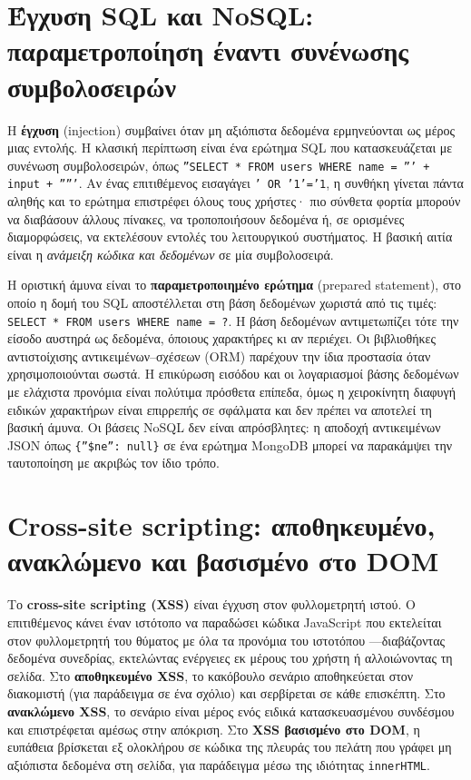\documentclass[11pt,openany]{book}
\begin{document}
\section{Έγχυση SQL και NoSQL: παραμετροποίηση έναντι συνένωσης συμβολοσειρών}\label{sec:9.2}
Η \textbf{έγχυση} (injection) συμβαίνει όταν μη αξιόπιστα δεδομένα ερμηνεύονται ως μέρος μιας εντολής. Η κλασική περίπτωση είναι ένα ερώτημα SQL που κατασκευάζεται με συνένωση συμβολοσειρών, όπως \texttt{''SELECT * FROM users WHERE name = ''' + input + '''''}. Αν ένας επιτιθέμενος εισαγάγει \texttt{' OR '1'='1}, η συνθήκη γίνεται πάντα αληθής και το ερώτημα επιστρέφει όλους τους χρήστες· πιο σύνθετα φορτία μπορούν να διαβάσουν άλλους πίνακες, να τροποποιήσουν δεδομένα ή, σε ορισμένες διαμορφώσεις, να εκτελέσουν εντολές του λειτουργικού συστήματος. Η βασική αιτία είναι η \emph{ανάμειξη κώδικα και δεδομένων} σε μία συμβολοσειρά.

Η οριστική άμυνα είναι το \textbf{παραμετροποιημένο ερώτημα} (prepared statement), στο οποίο η δομή του SQL αποστέλλεται στη βάση δεδομένων χωριστά από τις τιμές: \texttt{SELECT * FROM users WHERE name = ?}. Η βάση δεδομένων αντιμετωπίζει τότε την είσοδο αυστηρά ως δεδομένα, όποιους χαρακτήρες κι αν περιέχει. Οι βιβλιοθήκες αντιστοίχισης αντικειμένων–σχέσεων (ORM) παρέχουν την ίδια προστασία όταν χρησιμοποιούνται σωστά. Η επικύρωση εισόδου και οι λογαριασμοί βάσης δεδομένων με ελάχιστα προνόμια είναι πολύτιμα πρόσθετα επίπεδα, όμως η χειροκίνητη διαφυγή ειδικών χαρακτήρων είναι επιρρεπής σε σφάλματα και δεν πρέπει να αποτελεί τη βασική άμυνα. Οι βάσεις NoSQL δεν είναι απρόσβλητες: η αποδοχή αντικειμένων JSON όπως \texttt{\{''\$ne'': null\}} σε ένα ερώτημα MongoDB μπορεί να παρακάμψει την ταυτοποίηση με ακριβώς τον ίδιο τρόπο.

\section{Cross-site scripting: αποθηκευμένο, ανακλώμενο και βασισμένο στο DOM}\label{sec:9.3}
Το \textbf{cross-site scripting (XSS)} είναι έγχυση στον φυλλομετρητή ιστού. Ο επιτιθέμενος κάνει έναν ιστότοπο να παραδώσει κώδικα JavaScript που εκτελείται στον φυλλομετρητή του θύματος με όλα τα προνόμια του ιστοτόπου —διαβάζοντας δεδομένα συνεδρίας, εκτελώντας ενέργειες εκ μέρους του χρήστη ή αλλοιώνοντας τη σελίδα. Στο \textbf{αποθηκευμένο XSS}, το κακόβουλο σενάριο αποθηκεύεται στον διακομιστή (για παράδειγμα σε ένα σχόλιο) και σερβίρεται σε κάθε επισκέπτη. Στο \textbf{ανακλώμενο XSS}, το σενάριο είναι μέρος ενός ειδικά κατασκευασμένου συνδέσμου και επιστρέφεται αμέσως στην απόκριση. Στο \textbf{XSS βασισμένο στο DOM}, η ευπάθεια βρίσκεται εξ ολοκλήρου σε κώδικα της πλευράς του πελάτη που γράφει μη αξιόπιστα δεδομένα στη σελίδα, για παράδειγμα μέσω της ιδιότητας \texttt{innerHTML}.
\end{document}
